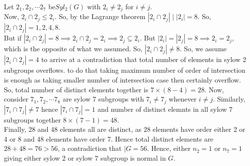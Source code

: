 \documentclass{article}
\begin{document}
Let $2_1,2_2,\cdots 2_7$ be$Syl_2(G)$ with $2_i \neq 2_j$ for $i \neq j$.\\
Now, $2_i \cap 2_j \leq 2_i$. So, by the Lagrange theorem $|2_i \cap 2_j|\mid |2_i|=8$. So, $|2_i\cap 2_j|=1,2,4,8$.\\
But if $|2_i\cap 2_j|=8 \implies 2_i \cap 2_j=2_i \implies 2_j\subseteq 2_i$. But $|2_i|=|2_j|=8 \implies 2_i=2_j$, which is the opposite of what we assumed.
So, $|2_i\cap 2_j|\neq 8$. So, we assume $|2_i\cap 2_j|=4$ to arrive at a contradiction that total number of elements in sylow 2 subgroups overflows. to do that taking maximum number of order of intersection is enough as taking smaller number of intersection case then certainly overflow. So, total number of distinct elements together is $7 \times (8-4)=28$.
Now, consider $7_1,7_2,\cdots 7_8$ are sylow 7 subgroups with $7_i\neq 7_j$ whenever $i\neq j$. Similarly, $|7_i\cap 7_j|\neq 7$ hence $|7_i\cap 7_j|=1$ and number of distinct elemnts in all sylow 7 subgroups together $8 \times (7-1)=48$.\\

Finally, 28 and 48 elements all are distinct, as $28$ elements have order either 2 or 4 or 8 and 48 elements have order 7. Hence total distinct elements are $28+48=76>56$, a contradiction that $|G=56$. Hence, either $n_2=1$ or $n_7=1$ giving either sylow 2 or sylow 7 subgroup is normal in $G$.

\subsection{}
\end{document}
